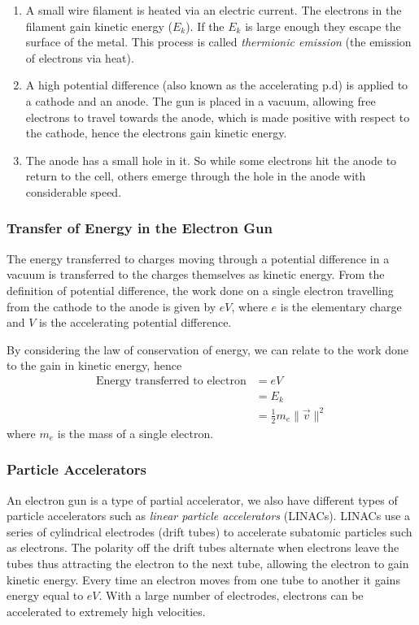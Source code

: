 \begin{enumerate}
    \item A small wire filament is heated via an electric current. The electrons in the filament gain kinetic energy ($E_k$). If the $E_k$ is large enough they escape the surface of the metal. This process is called \textit{thermionic emission} (the emission of electrons via heat). 
    \item A high potential difference (also known as the accelerating p.d) is applied to a cathode and an anode. The gun is placed in a vacuum, allowing free electrons to travel towards the anode, which is made positive with respect to the cathode, hence the electrons gain kinetic energy. 
    \item The anode has a small hole in it. So while some electrons hit the anode to return to the cell, others emerge through the hole in the anode with considerable speed.
\end{enumerate}

\subsubsection{Transfer of Energy in the Electron Gun}

The energy transferred to charges moving through a potential difference in a vacuum is transferred to the charges themselves as kinetic energy. From the definition of potential difference, the work done on a single electron travelling from the cathode to the anode is given by $eV$, where $e$ is the elementary charge and $V$ is the accelerating potential difference. 

By considering the law of conservation of energy, we can relate to the work done to the gain in kinetic energy, hence
\begin{align*}
    \text{Energy transferred to electron} &= eV \\
    &= E_k \\
    &= \frac{1}{2}m_e \| \vec{v} \|^2
\end{align*}
where $m_e$ is the mass of a single electron.

\subsubsection{Particle Accelerators}

An electron gun is a type of partial accelerator, we also have different types of particle accelerators such as \textit{linear particle accelerators} (LINACs). LINACs use a series of cylindrical electrodes (drift tubes) to accelerate subatomic particles such as electrons. The polarity off the drift tubes alternate when electrons leave the tubes thus attracting the electron to the next tube, allowing the electron to gain kinetic energy. Every time an electron moves from one tube to another it gains energy equal to $eV$. With a large number of electrodes, electrons can be accelerated to extremely high velocities. 

